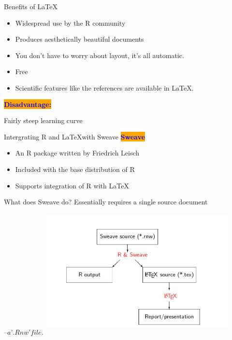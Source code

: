 \documentclass[xcolor=dvipsnames]{beamer}
\begin{document}
\begin{frame}{Benefits of \LaTeX }


\begin{itemize}
\item Widespread use by the R community
\item Produces aesthetically beautiful documents
\item You don't have to worry about layout, it's all automatic.
\item Free
\item Scientific features like the references are available in \LaTeX.

\end{itemize}

\textbf{\colorbox{orange}{\textcolor{blue}{Disadvantage:}}}

Fairly steep learning curve

\end{frame}



\begin{frame}{Intergrating R and \LaTeX  with Sweave}
\textbf{\colorbox{orange}{\textcolor{blue}{Sweave}}}
\begin{itemize}
\item An R package written by Friedrich Leisch
\item Included with the base distribution of R
\item Supports integration of R with \LaTeX
\end{itemize}
\end{frame}

\begin{frame}{What does Sweave do?}
Essentially requires a single source document $– a ’.Rnw’ file.$
\centering
\includegraphics[width=10cm, height=7cm]{plot.png} 
\end{frame}
\end{document}

